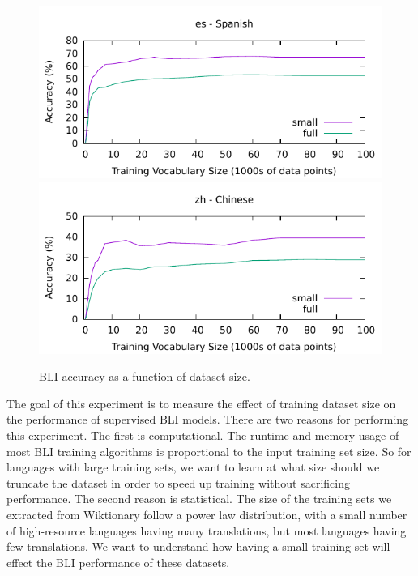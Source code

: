 \documentclass[11pt]{article}
\begin{document}
\begin{figure}
    \includegraphics[width=\columnwidth]{fig/dictsize-es.pdf}
    \includegraphics[width=\columnwidth]{fig/dictsize-zh.pdf}
    \caption{BLI accuracy as a function of dataset size.}
    \label{fig:dictsize}
\end{figure}


The goal of this experiment is to measure the effect of training dataset size on the performance of supervised BLI models.
There are two reasons for performing this experiment.
The first is computational.
The runtime and memory usage of most BLI training algorithms is proportional to the input training set size.
So for languages with large training sets, we want to learn at what size should we truncate the dataset in order to speed up training without sacrificing performance.
The second reason is statistical.
The size of the training sets we extracted from Wiktionary follow a power law distribution,
with a small number of high-resource languages having many translations,
but most languages having few translations.
We want to understand how having a small training set will effect the BLI performance of these datasets.
\end{document}
